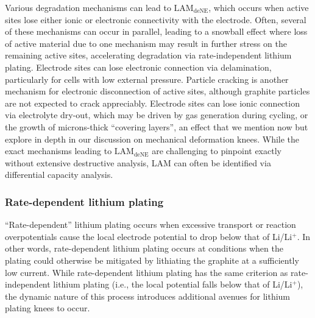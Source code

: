 \documentclass[journal=jpclcd,manuscript=article]{achemso}
\begin{document}
Various degradation mechanisms can lead to $\mathrm{LAM_{deNE}}$, which occurs when active sites lose either ionic or electronic connectivity with the electrode.
Often, several of these mechanisms can occur in parallel, leading to a snowball effect where loss of active material due to one mechanism may result in further stress on the remaining active sites, accelerating degradation via rate-independent lithium plating.
Electrode sites can lose electronic connection via delamination\cite{liu_aging_2010, cannarella_stress_2014, somerville_effect_2016, willenberg_high-precision_2020}, particularly for cells with low external pressure\cite{cannarella_stress_2014}. Particle cracking is another mechanism for electronic disconnection of active sites, although graphite particles are not expected to crack appreciably\cite{takahashi_examination_2015}{}.
Electrode sites can lose ionic connection via electrolyte dry-out, which may be driven by gas generation during cycling\cite{mao_calendar_2017, kupper_end--life_2018}{}, or the growth of microns-thick ``covering layers'', an effect that we mention now but explore in depth in our discussion on mechanical deformation knees.
While the exact mechanisms leading to $\mathrm{LAM_{deNE}}$ are challenging to pinpoint exactly without extensive destructive analysis, LAM can often be identified via differential capacity analysis.\cite{ansean_operando_2017, dubarry_durability_2018, baure_synthetic_2019, dubarry_big_2020}

\subsubsection{Rate-dependent lithium plating}

``Rate-dependent'' lithium plating occurs when excessive transport or reaction overpotentials cause the local electrode potential to drop below that of Li/Li$\mathrm{^+}$.
In other words, rate-dependent lithium plating occurs at conditions when the plating could otherwise be mitigated by lithiating the graphite at a sufficiently low current.
While rate-dependent lithium plating has the same criterion as rate-independent lithium plating (i.e., the local potential falls below that of Li/Li$^+$), the dynamic nature of this process introduces additional avenues for lithium plating knees to occur.
\end{document}

